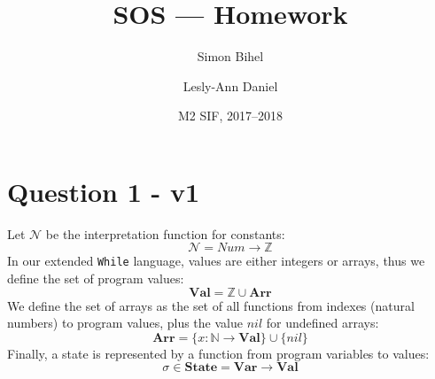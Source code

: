 \documentclass{article}
\title{SOS --- Homework}
\author{Simon Bihel \and Lesly-Ann Daniel}
\date{M2 SIF, 2017--2018}
\begin{document}
\maketitle

\section*{Question 1 - v1}
Let \(\mathcal{N}\) be the interpretation function for constants:
\[ \mathcal{N} = Num \rightarrow \mathbb{Z} \]
In our extended \texttt{While} language, values are either integers or arrays, thus we define the set of program values:
\[ \textbf{Val} = \mathbb{Z} \cup \textbf{Arr}\]
We define the set of arrays as the set of all functions from indexes (natural numbers) to program values, plus the value \(nil\) for undefined arrays:
\[\textbf{Arr} = \{x:\mathbb{N} \rightarrow \textbf{Val}\} \cup \{nil\} \]
Finally, a state is represented by a function from program variables to values:
\[\sigma \in \textbf{State} = \textbf{Var} \rightarrow \textbf{Val} \]

\end{document}
